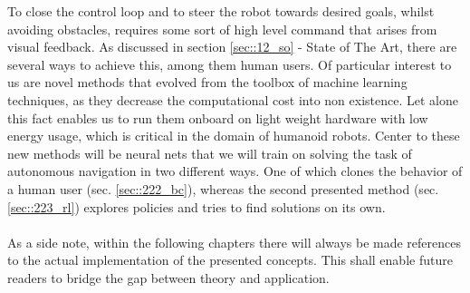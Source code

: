 To close the control loop and to steer the robot towards desired goals, whilst avoiding obstacles, requires some sort of high level command that arises from visual feedback. As discussed in section \ref{sec::12_so} - State of The Art, there are several ways to achieve this, among them human users. Of particular interest to us are novel methods that evolved from the toolbox of machine learning techniques, as they decrease the computational cost into non existence. Let alone this fact enables us to run them onboard on light weight hardware with low energy usage, which is critical in the domain of humanoid robots. Center to these new methods will be neural nets that we will train on solving the task of autonomous navigation in two different ways. One of which clones the behavior of a human user (sec. \ref{sec::222_bc}), whereas the second presented method (sec. \ref{sec::223_rl}) explores policies and tries to find solutions on its own.
\\\\
As a side note, within the following chapters there will always be made references to the actual implementation of the presented concepts. This shall enable future readers to bridge the gap between theory and application.